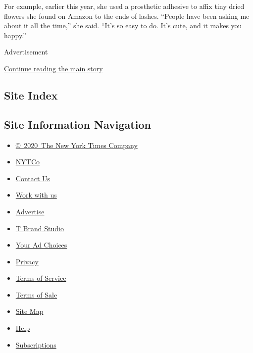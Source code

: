 For example, earlier this year, she used a prosthetic adhesive to affix
tiny dried flowers she found on Amazon to the ends of lashes. ``People
have been asking me about it all the time,'' she said. ``It's so easy to
do. It's cute, and it makes you happy.''

Advertisement

\protect\hyperlink{after-bottom}{Continue reading the main story}

\hypertarget{site-index}{%
\subsection{Site Index}\label{site-index}}

\hypertarget{site-information-navigation}{%
\subsection{Site Information
Navigation}\label{site-information-navigation}}

\begin{itemize}
\tightlist
\item
  \href{https://help.nytimes.com/hc/en-us/articles/115014792127-Copyright-notice}{©~2020~The
  New York Times Company}
\end{itemize}

\begin{itemize}
\tightlist
\item
  \href{https://www.nytco.com/}{NYTCo}
\item
  \href{https://help.nytimes.com/hc/en-us/articles/115015385887-Contact-Us}{Contact
  Us}
\item
  \href{https://www.nytco.com/careers/}{Work with us}
\item
  \href{https://nytmediakit.com/}{Advertise}
\item
  \href{http://www.tbrandstudio.com/}{T Brand Studio}
\item
  \href{https://www.nytimes.com/privacy/cookie-policy\#how-do-i-manage-trackers}{Your
  Ad Choices}
\item
  \href{https://www.nytimes.com/privacy}{Privacy}
\item
  \href{https://help.nytimes.com/hc/en-us/articles/115014893428-Terms-of-service}{Terms
  of Service}
\item
  \href{https://help.nytimes.com/hc/en-us/articles/115014893968-Terms-of-sale}{Terms
  of Sale}
\item
  \href{https://spiderbites.nytimes.com}{Site Map}
\item
  \href{https://help.nytimes.com/hc/en-us}{Help}
\item
  \href{https://www.nytimes.com/subscription?campaignId=37WXW}{Subscriptions}
\end{itemize}
